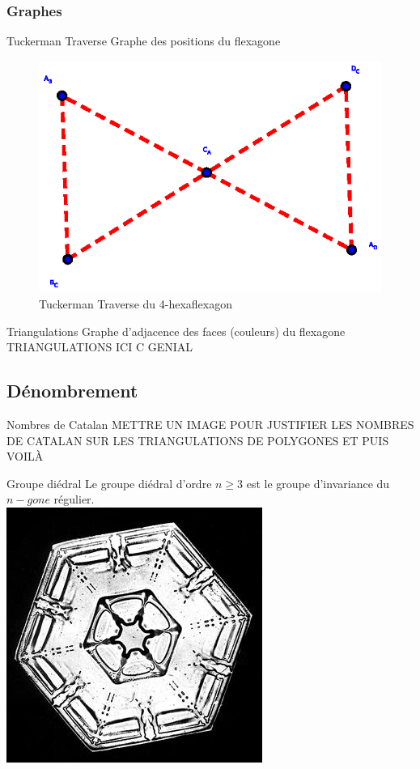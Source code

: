 \documentclass[french,xcolor=dvipsnames]{beamer}
\begin{document}
		\subsubsection{Graphes}
		\begin{frame}{Tuckerman Traverse}
			Graphe des positions du flexagone
			\begin{figure}
				\includegraphics[scale=0.6]{TT_graphe_4.eps}
				\caption{Tuckerman Traverse du 4-hexaflexagon}
			\end{figure}
		\end{frame}		
		
		\begin{frame}{Triangulations}
			Graphe d'adjacence des faces (couleurs) du flexagone
			TRIANGULATIONS ICI C GENIAL		
		\end{frame}
		
		\subsection{Dénombrement}
		\begin{frame}{Nombres de Catalan}
			METTRE UN IMAGE POUR JUSTIFIER LES NOMBRES DE CATALAN SUR LES TRIANGULATIONS DE POLYGONES ET PUIS VOILÀ
		\end{frame}
		\begin{frame}{Groupe diédral}
			Le groupe diédral d'ordre $n\geqslant 3$ est le groupe d'invariance du $n-gone$ régulier.\\
			\includegraphics[scale=0.22]{snowflake.jpg}
		\end{frame}
		
\end{document}
